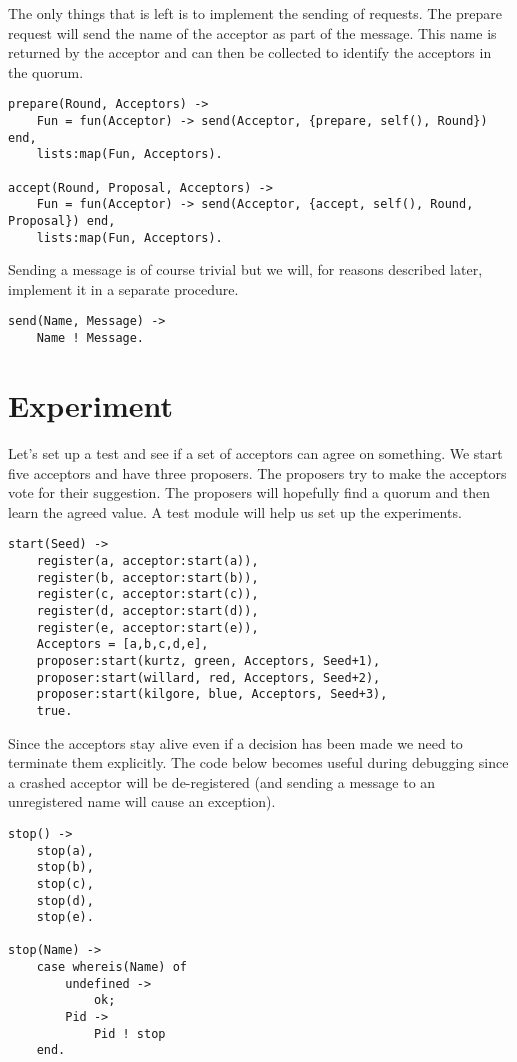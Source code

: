 \documentclass[a4paper,11pt]{article}
\begin{document}
The only things that is left is to implement the sending of
requests. The prepare request will send the name of the acceptor as
part of the message. This name is returned by the acceptor and can then
be collected to identify the acceptors in the quorum. 

\begin{verbatim}
prepare(Round, Acceptors) ->
    Fun = fun(Acceptor) -> send(Acceptor, {prepare, self(), Round}) end,
    lists:map(Fun, Acceptors).

accept(Round, Proposal, Acceptors) ->
    Fun = fun(Acceptor) -> send(Acceptor, {accept, self(), Round, Proposal}) end,
    lists:map(Fun, Acceptors).
\end{verbatim}

Sending a message is of course trivial but we will, for reasons
described later, implement it in a separate procedure.

\begin{verbatim}
send(Name, Message) ->
    Name ! Message.
\end{verbatim}


\section{Experiment}

Let's set up a test and see if a set of acceptors can agree on
something. We start five acceptors and have three proposers. The
proposers try to make the acceptors vote for their suggestion. The
proposers will hopefully find a quorum and then learn the agreed
value. A test module will help us set up the experiments.

\begin{verbatim}
start(Seed) ->
    register(a, acceptor:start(a)),
    register(b, acceptor:start(b)),
    register(c, acceptor:start(c)),
    register(d, acceptor:start(d)),
    register(e, acceptor:start(e)),
    Acceptors = [a,b,c,d,e],
    proposer:start(kurtz, green, Acceptors, Seed+1),
    proposer:start(willard, red, Acceptors, Seed+2),
    proposer:start(kilgore, blue, Acceptors, Seed+3),
    true.
\end{verbatim}

Since the acceptors stay alive even if a decision has been made we
need to terminate them explicitly. The code below becomes useful
during debugging since a crashed acceptor will be de-registered (and
sending a message to an unregistered name will cause an exception).

\begin{verbatim}
stop() ->
    stop(a),
    stop(b),
    stop(c),
    stop(d),
    stop(e).

stop(Name) ->
    case whereis(Name) of
        undefined ->
            ok;
        Pid ->
            Pid ! stop
    end.
\end{verbatim}
\end{document}
